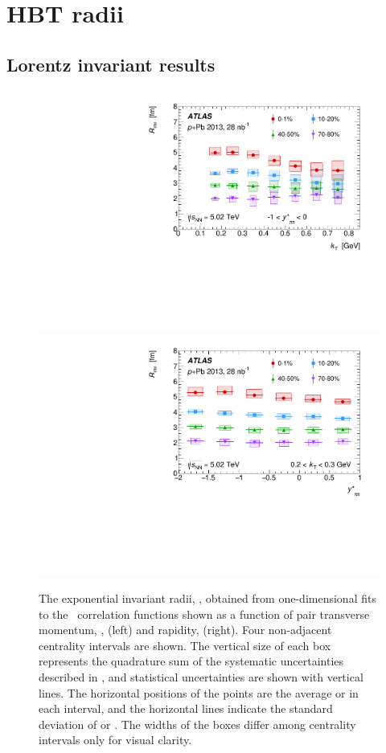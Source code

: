 \FloatBarrier
\section{HBT radii}
\subsection{Lorentz invariant results}
\label{subsec:invariant_results}

\begin{figure}[t]
\centering
\includegraphics[width=0.49\linewidth]{canqinv_R_vs_kt.pdf}
\includegraphics[width=0.49\linewidth]{canqinv_R_vs_kys.pdf}
\caption{The exponential invariant radii, \Rinv, obtained from one-dimensional fits to
the \qinv\ correlation functions shown as a function of pair transverse momentum, \kt, (left) and rapidity, \kys (right). Four non-adjacent centrality intervals are shown. The vertical size of each box represents the quadrature sum of the systematic uncertainties described in , and statistical uncertainties are shown with vertical lines. The horizontal positions of the points are the average \kt or \kys in each interval, and the horizontal lines indicate the standard deviation of \kt or \kys. The widths of the boxes differ among centrality intervals only for visual clarity.}
\label{fig:results_Rinv_kt}
\end{figure}
